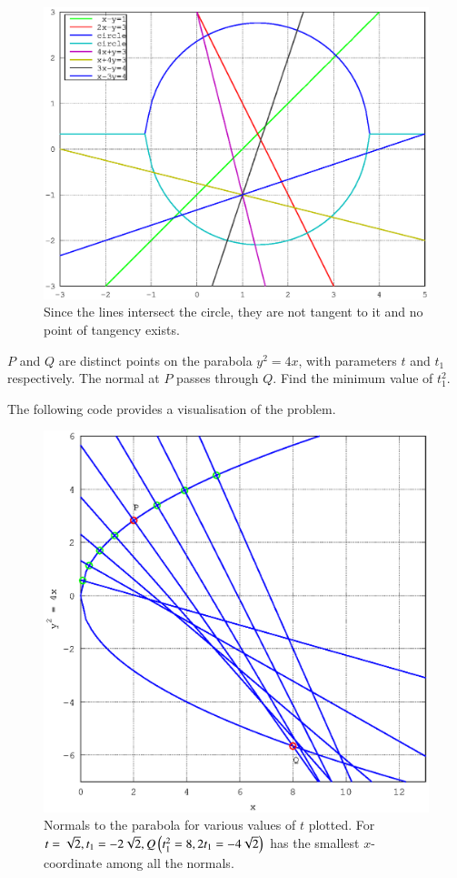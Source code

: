 \documentclass[journal,12pt,twocolumn]{IEEEtran}
\begin{document}
\begin{figure}[h]
\centering
\includegraphics[width=\columnwidth]{./version_2/ee16b1022/ee16b1022}
\caption{ Since the lines intersect the circle, they are not tangent to it and no point of tangency exists. }
\label{fig_22}	
\end{figure}
%
\begin{problem}
$P$ and $Q$ are distinct points on the parabola $y^2 = 4x$, with parameters $t$ and $t_1$ respectively. The normal at $P$ passes through $Q$.  Find the minimum value of $t_1^2$.
\end{problem}
\solution

The following code provides a visualisation of the problem.

%
\begin{figure}[h]
\centering
\includegraphics[width=\columnwidth]{./version_2/ee16b1023/ee16b1023}
\caption{ Normals to the parabola for various values of $t$ plotted.  For $t = \sqrt{2}, t_1 = -2\sqrt{2}, Q\left(t_1^2 = 8, 2t_1 = -4\sqrt{2}\right)$ has the smallest $x$-coordinate   among all the normals.}
\label{fig_23}	
\end{figure}
\end{document}

